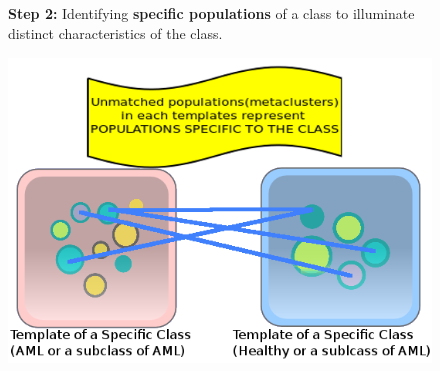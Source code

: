 \documentclass[landscape]{sciposter}
\begin{document}
\begin{multicols}{5}
\begin{figure}[t!h]
\subsection*{}
\begin{minipage}[b]{\linewidth}
\textbf{Step 2:}
Identifying \textbf{specific populations} of a class to illuminate distinct characteristics of the class.
\vspace*{+1cm}
\end{minipage} \hfill
\begin{minipage}[b]{\linewidth}
\includegraphics[width=\linewidth]{images/specific.png}
\end{minipage} \hfill
\subsection*{}
\begin{minipage}[b]{\linewidth}

\end{minipage}
\end{figure}
\end{multicols}
\end{document}
